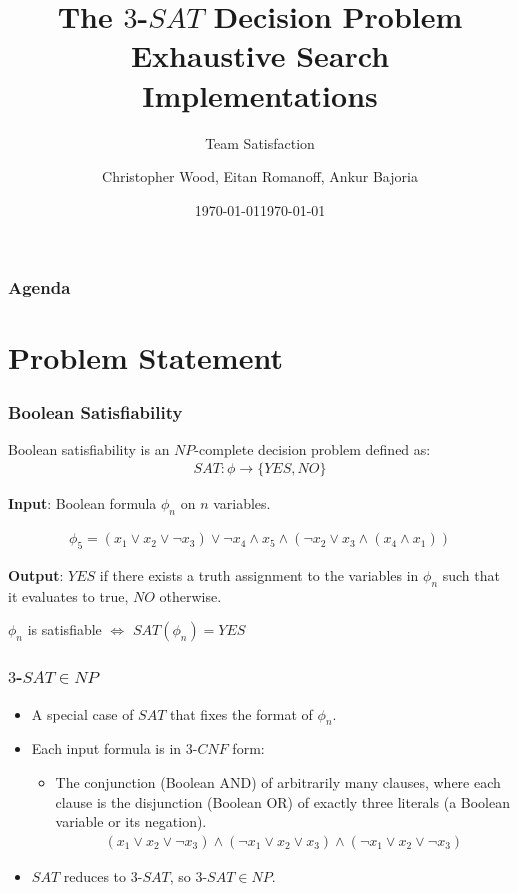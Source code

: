 \documentclass[handout]{beamer}
\title[Team Satisfaction - $3$-$SAT$]{The $3$-$SAT$ Decision Problem \\ Exhaustive Search Implementations}
\institute[RIT]{}
\date{\today}
\subtitle{Team Satisfaction}
\author{Christopher Wood, Eitan Romanoff, Ankur Bajoria}
\date{\today}
\begin{document}
\begin{frame}
	\titlepage
\end{frame}

\begin{frame}
	\frametitle{Agenda}
	\tableofcontents
\end{frame}

\section{Problem Statement}
\begin{frame}
	\frametitle{Boolean Satisfiability}

	Boolean satisfiability is an $NP$-complete decision problem defined as:
	\begin{align*}
	SAT : \phi \to \{YES, NO\}
	\end{align*}

	\medskip

	\textbf{Input}: Boolean formula $\phi_n$ on $n$ variables.
	
	\begin{align*}
		\phi_5 = (x_1 \lor x_2 \lor \lnot x_3) \lor \lnot x_4 \land x_5 \land (\lnot x_2 \lor x_3 \land (x_4 \land x_1))
	\end{align*}

	\medskip 

	\textbf{Output}: $YES$ if there exists a truth assignment to the
	variables in $\phi_n$ such that it evaluates to true, $NO$ otherwise.

	\medskip

	\begin{center}
		$\phi_n$ is satisfiable $\Leftrightarrow$ $SAT(\phi_n) = YES$
	\end{center}

\end{frame}


\begin{frame}
	\frametitle{$3$-$SAT \in NP$}
	\begin{itemize}
		\item A special case of $SAT$ that fixes the format of $\phi_n$.
		\item Each input formula is in $3$-$CNF$ form:
		\begin{itemize}
			\item The conjunction (Boolean AND) of arbitrarily many clauses, 
			where each clause is the disjunction (Boolean OR) of exactly three literals 
			(a Boolean variable or its negation).
			\begin{align*}
				(x_1 \lor x_2 \lor \lnot x_3) \land (\lnot x_1 \lor x_2 \lor x_3) \land (\lnot x_1 \lor x_2 \lor \lnot x_3)
			\end{align*}
		\end{itemize}
		\item $SAT$ reduces to $3$-$SAT$, so $3$-$SAT \in NP$.
	\end{itemize}
\end{frame}
\end{document}
